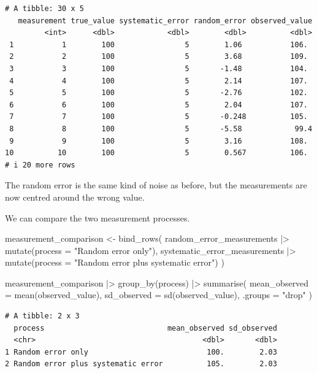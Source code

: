 \documentclass[
  letterpaper,
  DIV=11,
  numbers=noendperiod]{scrreprt}
\newenvironment{Shaded}{\begin{snugshade}}{\end{snugshade}}
\newcommand{\AttributeTok}[1]{\textcolor[rgb]{0.40,0.45,0.13}{#1}}
\newcommand{\FunctionTok}[1]{\textcolor[rgb]{0.28,0.35,0.67}{#1}}
\newcommand{\NormalTok}[1]{\textcolor[rgb]{0.00,0.23,0.31}{#1}}
\newcommand{\OtherTok}[1]{\textcolor[rgb]{0.00,0.23,0.31}{#1}}
\newcommand{\SpecialCharTok}[1]{\textcolor[rgb]{0.37,0.37,0.37}{#1}}
\newcommand{\StringTok}[1]{\textcolor[rgb]{0.13,0.47,0.30}{#1}}
\begin{document}
\begin{verbatim}
# A tibble: 30 x 5
   measurement true_value systematic_error random_error observed_value
         <int>      <dbl>            <dbl>        <dbl>          <dbl>
 1           1        100                5        1.06           106. 
 2           2        100                5        3.68           109. 
 3           3        100                5       -1.48           104. 
 4           4        100                5        2.14           107. 
 5           5        100                5       -2.76           102. 
 6           6        100                5        2.04           107. 
 7           7        100                5       -0.248          105. 
 8           8        100                5       -5.58            99.4
 9           9        100                5        3.16           108. 
10          10        100                5        0.567          106. 
# i 20 more rows
\end{verbatim}

The random error is the same kind of noise as before, but the
measurements are now centred around the wrong value.

We can compare the two measurement processes.

\begin{Shaded}
\begin{Highlighting}[]
\NormalTok{measurement\_comparison }\OtherTok{\textless{}{-}} \FunctionTok{bind\_rows}\NormalTok{(}
\NormalTok{  random\_error\_measurements }\SpecialCharTok{|\textgreater{}}
    \FunctionTok{mutate}\NormalTok{(}\AttributeTok{process =} \StringTok{"Random error only"}\NormalTok{),}
\NormalTok{  systematic\_error\_measurements }\SpecialCharTok{|\textgreater{}}
    \FunctionTok{mutate}\NormalTok{(}\AttributeTok{process =} \StringTok{"Random error plus systematic error"}\NormalTok{)}
\NormalTok{)}

\NormalTok{measurement\_comparison }\SpecialCharTok{|\textgreater{}}
  \FunctionTok{group\_by}\NormalTok{(process) }\SpecialCharTok{|\textgreater{}}
  \FunctionTok{summarise}\NormalTok{(}
    \AttributeTok{mean\_observed =} \FunctionTok{mean}\NormalTok{(observed\_value),}
    \AttributeTok{sd\_observed =} \FunctionTok{sd}\NormalTok{(observed\_value),}
    \AttributeTok{.groups =} \StringTok{"drop"}
\NormalTok{  )}
\end{Highlighting}
\end{Shaded}

\begin{verbatim}
# A tibble: 2 x 3
  process                            mean_observed sd_observed
  <chr>                                      <dbl>       <dbl>
1 Random error only                           100.        2.03
2 Random error plus systematic error          105.        2.03
\end{verbatim}
\end{document}
